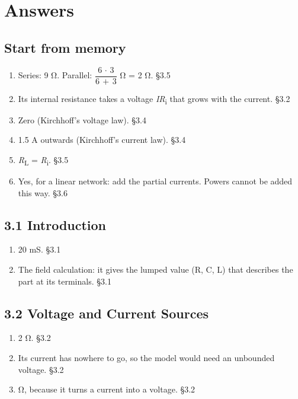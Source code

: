 \documentclass[11pt]{article}
\begin{document}
\clearpage
\section{Answers}
\begin{keepsection}\subsection{Start from memory}

\begin{enumerate}
\item Series: 9 Ω. Parallel: {\small\ensuremath{\dfrac{6\, \cdot \, 3}{6\, +\, 3}}} Ω = 2 Ω. \hfill{\small\color{FAUblue}§3.5}
\item Its internal resistance takes a voltage \textit{I}\textit{R}\textsubscript{i} that grows with the current. \hfill{\small\color{FAUblue}§3.2}
\item Zero (Kirchhoff’s voltage law). \hfill{\small\color{FAUblue}§3.4}
\item 1.5 A outwards (Kirchhoff’s current law). \hfill{\small\color{FAUblue}§3.4}
\item \textit{R}\textsubscript{L} = \textit{R}\textsubscript{i}. \hfill{\small\color{FAUblue}§3.5}
\item Yes, for a linear network: add the partial currents. Powers cannot be added this way. \hfill{\small\color{FAUblue}§3.6}
\end{enumerate}

\end{keepsection}
\begin{keepsection}\subsection{3.1 Introduction}

\begin{enumerate}
\item 20 mS. \hfill{\small\color{FAUblue}§3.1}
\item The field calculation: it gives the lumped value (R, C, L) that describes the part at its terminals. \hfill{\small\color{FAUblue}§3.1}
\end{enumerate}

\end{keepsection}
\begin{keepsection}\subsection{3.2 Voltage and Current Sources}

\begin{enumerate}
\item 2 Ω. \hfill{\small\color{FAUblue}§3.2}
\item Its current has nowhere to go, so the model would need an unbounded voltage. \hfill{\small\color{FAUblue}§3.2}
\item Ω, because it turns a current into a voltage. \hfill{\small\color{FAUblue}§3.2}
\end{enumerate}

\end{keepsection}
\end{document}
